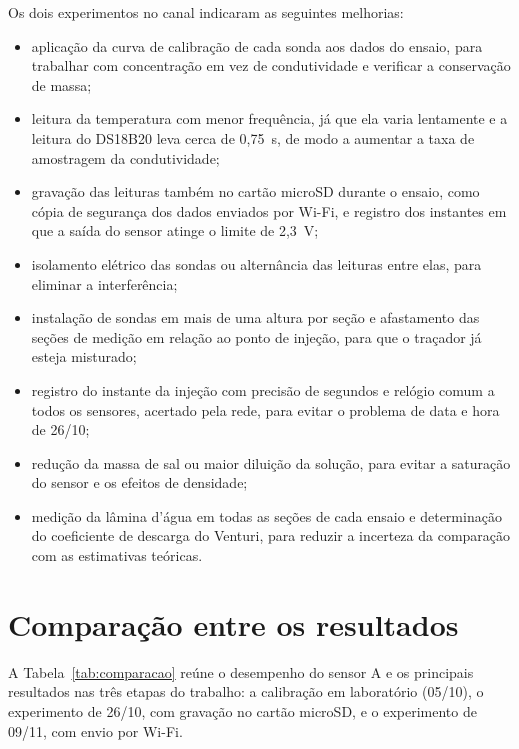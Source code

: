 \documentclass[12pt,a4paper]{article}
\begin{document}
Os dois experimentos no canal indicaram as seguintes melhorias:
\begin{itemize}
  \item aplicação da curva de calibração de cada sonda aos dados do ensaio, para trabalhar com concentração em vez de condutividade e verificar a conservação de massa;
  \item leitura da temperatura com menor frequência, já que ela varia lentamente e a leitura do DS18B20 leva cerca de 0,75~s, de modo a aumentar a taxa de amostragem da condutividade;
  \item gravação das leituras também no cartão microSD durante o ensaio, como cópia de segurança dos dados enviados por Wi-Fi, e registro dos instantes em que a saída do sensor atinge o limite de 2,3~V;
  \item isolamento elétrico das sondas ou alternância das leituras entre elas, para eliminar a interferência;
  \item instalação de sondas em mais de uma altura por seção e afastamento das seções de medição em relação ao ponto de injeção, para que o traçador já esteja misturado;
  \item registro do instante da injeção com precisão de segundos e relógio comum a todos os sensores, acertado pela rede, para evitar o problema de data e hora de 26/10;
  \item redução da massa de sal ou maior diluição da solução, para evitar a saturação do sensor e os efeitos de densidade;
  \item medição da lâmina d'água em todas as seções de cada ensaio e determinação do coeficiente de descarga do Venturi, para reduzir a incerteza da comparação com as estimativas teóricas.
\end{itemize}

\section{Comparação entre os resultados}
\label{sec:comparacao}

A Tabela~\ref{tab:comparacao} reúne o desempenho do sensor A e os principais resultados nas três etapas do trabalho: a calibração em laboratório (05/10), o experimento de 26/10, com gravação no cartão microSD, e o experimento de 09/11, com envio por Wi-Fi.
\end{document}
